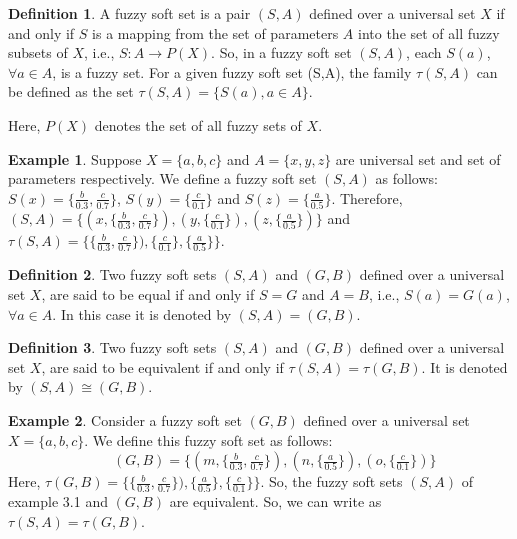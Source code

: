 \documentclass{article}
\theoremstyle{definition}
\newtheorem{definition}{Definition}[section]
\newtheorem{example}{Example}[section]
\begin{document}
\begin{definition}
    A fuzzy soft set is a pair $(S,A)$ defined over a universal set $X$ if and only if $S$ is a mapping from the set of parameters $A$ into the set of all fuzzy subsets of $X$, i.e., $S : A\to P(X)$. So, in a fuzzy soft set $(S, A)$, each $S(a)$, $\forall a \in A$, is a fuzzy set. For a given fuzzy soft set (S,A), the family $\tau (S,A)$ can be defined as the set $\tau (S,A)=\{S(a), a\in A \}$.

    Here, $P(X)$ denotes the set of all fuzzy sets of $X$.\\
\end{definition}
\begin{example}
    Suppose $X=\{a, b, c\}$ and $A=\{x, y, z\}$ are universal set and set of parameters respectively. We define a fuzzy soft set $(S,A)$ as follows: $S(x)=\{\frac{b}{0.3}, \frac{c}{0.7}\}$, $S(y)=\{\frac{c}{0.1}\}$ and  $S(z)=\{\frac{a}{0.5}\}$. Therefore, $(S,A)=\{(x, \{\frac{b}{0.3}, \frac{c}{0.7}\}), (y, \{\frac{c}{0.1}\}), (z,\{\frac{a}{0.5}\})\}$ and  $\tau (S,A)=\{ \{\frac{b}{0.3}, \frac{c}{0.7}\}), \{\frac{c}{0.1}\}, \{\frac{a}{0.5}\}\}$.\\
\end{example}
\begin{definition}
       Two fuzzy soft sets $(S,A)$ and $(G,B)$ defined over a universal set $X$, are said to be equal if and only if $S=G$ and $A=B$, i.e., $S(a)=G(a)$, $\forall a\in A$. In this case it is denoted by $(S,A)=(G,B)$.\\
\end{definition}
\begin{definition}
Two fuzzy soft sets $(S,A)$ and $(G,B)$ defined over a universal set $X$, are said to be equivalent if and only if $\tau (S,A)=\tau (G,B)$. It is denoted by $(S,A) \cong (G,B)$.\\
\end{definition}

\begin{example}
    Consider a fuzzy soft set $(G,B)$ defined over a universal set $X=\{a, b, c\}$. We define this fuzzy soft set as follows: \\
    
    ~~~~~~~~~~~~~~~$(G,B)=\{(m, \{\frac{b}{0.3}, \frac{c}{0.7}\}), (n, \{\frac{a}{0.5}\}), (o,\{\frac{c}{0.1}\})\}$\\

    
    Here,  $\tau (G,B)=\{ \{\frac{b}{0.3}, \frac{c}{0.7}\}), \{\frac{a}{0.5}\}, \{\frac{c}{0.1}\}\}$. So, the fuzzy soft sets $(S,A)$ of example 3.1 and $(G,B)$ are equivalent. So, we can write as $\tau(S,A)= \tau(G,B)$.
\end{example}
\end{document}
